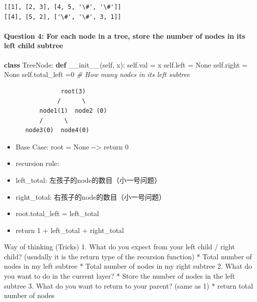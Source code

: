 \documentclass[11pt]{article}
\providecommand{\tightlist}{%
      \setlength{\itemsep}{0pt}\setlength{\parskip}{0pt}}
\newenvironment{Shaded}{}{}
\newcommand{\KeywordTok}[1]{\textcolor[rgb]{0.00,0.44,0.13}{\textbf{{#1}}}}
\newcommand{\DecValTok}[1]{\textcolor[rgb]{0.25,0.63,0.44}{{#1}}}
\newcommand{\CommentTok}[1]{\textcolor[rgb]{0.38,0.63,0.69}{\textit{{#1}}}}
\newcommand{\FunctionTok}[1]{\textcolor[rgb]{0.02,0.16,0.49}{{#1}}}
\newcommand{\NormalTok}[1]{{#1}}
\newcommand{\VariableTok}[1]{\textcolor[rgb]{0.10,0.09,0.49}{{#1}}}
\newcommand{\OperatorTok}[1]{\textcolor[rgb]{0.40,0.40,0.40}{{#1}}}
\begin{document}
    \begin{Verbatim}[commandchars=\\\{\}]
[[1], [2, 3], [4, 5, '\#', '\#']]
[[4], [5, 2], ['\#', '\#', 3, 1]]

    \end{Verbatim}

    \paragraph{Question 4: For each node in a tree, store the number of
nodes in its left child
subtree}\label{question-4-for-each-node-in-a-tree-store-the-number-of-nodes-in-its-left-child-subtree}

\begin{Shaded}
\begin{Highlighting}[]
\KeywordTok{class}\NormalTok{ TreeNode:}
    \KeywordTok{def} \FunctionTok{__init__}\NormalTok{(}\VariableTok{self}\NormalTok{, x):}
        \VariableTok{self}\NormalTok{.val }\OperatorTok{=}\NormalTok{ x}
        \VariableTok{self}\NormalTok{.left }\OperatorTok{=} \VariableTok{None}
        \VariableTok{self}\NormalTok{.right }\OperatorTok{=} \VariableTok{None}
        \VariableTok{self}\NormalTok{.total_left }\OperatorTok{=}\DecValTok{0} \CommentTok{# How many nodes in its left subtree}
\end{Highlighting}
\end{Shaded}

\begin{verbatim}
                root(3)
               /      \
          node1(1)  node2 (0)
          /      \  
      node3(0)  node4(0)
\end{verbatim}

\begin{itemize}
\tightlist
\item
  Base Case: root = None -\/-\textgreater{} return 0
\item
  recursion rule:
\item
  left\_total: 左孩子的node的数目（小一号问题）
\item
  right\_total: 右孩子的node的数目（小一号问题）
\item
  root.total\_left = left\_total
\item
  return 1 + left\_total + right\_total
\end{itemize}

Way of thinking (Tricks) 1. What do you expect from your left child /
right child? (usudally it is the return type of the recursion function)
* Total number of nodes in my left subtree * Total number of nodes in my
right subtree 2. What do you want to do in the current layer? * Store
the number of nodes in the left subtree 3. What do you want to return to
your parent? (same as 1) * return total number of nodes
\end{document}
